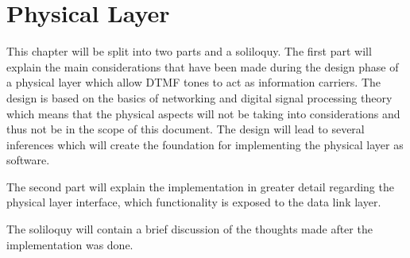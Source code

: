 \chapter{Physical Layer}
This chapter will be split into two parts and a soliloquy. The first part will
explain the main considerations that have been made during the design phase of
a physical layer which allow DTMF tones to act as information carriers.
The design is based on the basics of networking and digital signal processing
theory which means that the physical aspects will not be taking into considerations
and thus not be in the scope of this document. The design will lead to several
inferences which will create the foundation for implementing the physical layer as software.

The second part will explain the implementation in greater detail regarding the physical layer
interface, which functionality is exposed to the data link layer. 

The soliloquy will contain a brief discussion of the thoughts made after the implementation
was done.

